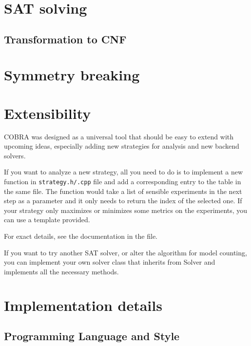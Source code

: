 \section{SAT solving} \label{s:cobra-sat}

\subsection{Transformation to CNF}

\section{Symmetry breaking}

\section{Extensibility}

COBRA was designed as a universal tool that should be easy to extend with
  upcoming ideas, especially adding new strategies for analysis
  and new backend solvers.

If you want to analyze a new strategy, all you need to do is to implement
  a new function in \texttt{strategy.h/.cpp} file and add a corresponding entry
  to the  table in the same file.
The function would take a list of sensible experiments in the next step as a parameter
  and it only needs to return the index of the selected one.
If your strategy only maximizes or minimizes some metrics on the experiments,
  you can use a template provided.

For exact details, see the documentation in the file.

If you want to try another SAT solver, or alter the algorithm for model counting,
  you can implement your own solver class that inherits from Solver and
  implements all the necessary methods.

\section{Implementation details}

\subsection{Programming Language and Style}


